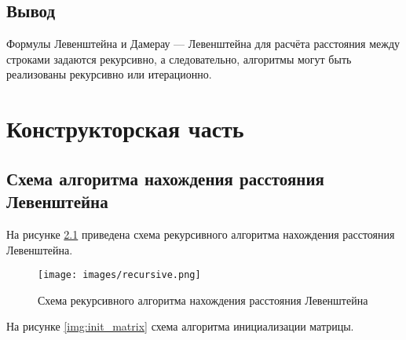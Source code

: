 \documentclass[a4paper,14pt, unknownkeysallowed]{extreport}
\begin{document}
\section{Вывод}

Формулы Левенштейна и Дамерау — Левенштейна для расчёта расстояния между строками задаются рекурсивно, а следовательно, алгоритмы могут быть реализованы рекурсивно или итерационно.


\chapter{Конструкторская часть}

\section{Схема алгоритма нахождения расстояния Левенштейна}

На рисунке \ref{img:lev_dist_rec} приведена схема рекурсивного алгоритма нахождения расстояния Левенштейна.

\begin{figure}[hbt]
\centering
\texttt{[image: images/recursive.png]}
\caption{Схема рекурсивного алгоритма нахождения расстояния Левенштейна}
\label{img:lev_dist_rec}
\end{figure}

На рисунке \ref{img:init_matrix} схема алгоритма инициализации матрицы.
\end{document}
